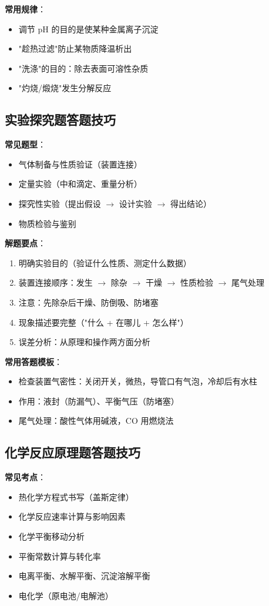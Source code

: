 \textbf{常用规律}：
\begin{itemize}
  \item 调节 pH 的目的是使某种金属离子沉淀
  \item "趁热过滤"防止某物质降温析出
  \item "洗涤"的目的：除去表面可溶性杂质
  \item "灼烧/煅烧"发生分解反应
\end{itemize}

\subsection{实验探究题答题技巧}

\textbf{常见题型}：
\begin{itemize}
  \item 气体制备与性质验证（装置连接）
  \item 定量实验（中和滴定、重量分析）
  \item 探究性实验（提出假设 $\to$ 设计实验 $\to$ 得出结论）
  \item 物质检验与鉴别
\end{itemize}

\textbf{解题要点}：
\begin{enumerate}
  \item 明确实验目的（验证什么性质、测定什么数据）
  \item 装置连接顺序：发生 $\to$ 除杂 $\to$ 干燥 $\to$ 性质检验 $\to$ 尾气处理
  \item 注意：先除杂后干燥、防倒吸、防堵塞
  \item 现象描述要完整（"什么 + 在哪儿 + 怎么样"）
  \item 误差分析：从原理和操作两方面分析
\end{enumerate}

\textbf{常用答题模板}：
\begin{itemize}
  \item 检查装置气密性：关闭开关，微热，导管口有气泡，冷却后有水柱
  \item 作用：液封（防漏气）、平衡气压（防堵塞）
  \item 尾气处理：酸性气体用碱液，$\text{CO}$ 用燃烧法
\end{itemize}

\subsection{化学反应原理题答题技巧}

\textbf{常见考点}：
\begin{itemize}
  \item 热化学方程式书写（盖斯定律）
  \item 化学反应速率计算与影响因素
  \item 化学平衡移动分析
  \item 平衡常数计算与转化率
  \item 电离平衡、水解平衡、沉淀溶解平衡
  \item 电化学（原电池/电解池）
\end{itemize}

